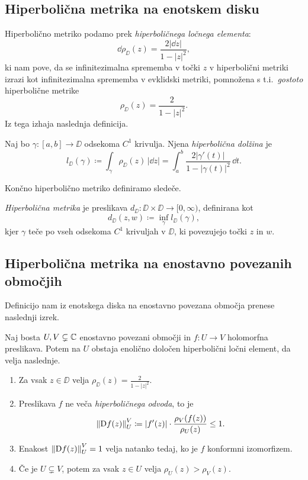 \subsection{Hiperbolična metrika na enotskem disku}

Hiperbolično metriko podamo prek \emph{hiperboličnega ločnega elementa}:
\[\dd \rho_{\DD} (z) = \frac{2 |\dd z|}{1 - |z|^2},\]
ki nam pove, da se infinitezimalna sprememba v točki \(z\) v hiperbolični metriki izrazi kot infinitezimalna sprememba v evklidski metriki, pomnožena s t.i.~\emph{gostoto} hiperbolične metrike
\[\rho_{\DD} (z) = \frac{2}{1 - |z|^2}.\]
Iz tega izhaja naslednja definicija.

\begin{definicija}
    Naj bo \(\gamma \colon [a, b] \to \DD\) odsekoma \(C^1\) krivulja. Njena \emph{hiperbolična dolžina} je
    \[l_{\DD} (\gamma) \coloneq \int_{\gamma} \rho_{\DD} (z) \, | \dd z | = \int_{a}^{b} \frac{2 | \gamma' (t) | }{1 - | \gamma (t) |^2} \, \dd t.\]
\end{definicija}

\noindent Končno hiperbolično metriko definiramo sledeče.

\begin{definicija}
    \emph{Hiperbolična metrika} je preslikava
    \(d_{\DD} \colon \DD \times \DD \to [0, \infty)\), definirana kot
    \[d_{\DD} (z, w) \coloneq \inf_{\gamma} l_{\DD} (\gamma),\]
    kjer \(\gamma\) teče po vseh odsekoma \(C^1\) krivuljah v \(\DD\), ki
    povezujejo točki \(z\) in \(w\).
\end{definicija}

\subsection{Hiperbolična metrika na enostavno povezanih območjih}

\noindent Definicijo nam iz enotskega diska na enostavno povezana območja prenese naslednji izrek.

\begin{izrek}[Pick] \label{thm:pick}
    Naj bosta \(U, V \subsetneq \mathbb C\) enostavno povezani območji in \(f \colon U \to V\) holomorfna preslikava. Potem na \(U\) obstaja enolično določen hiperbolični ločni element, da velja naslednje.
    \begin{enumerate}
        \item Za vsak \(z \in \DD\) velja \(\rho_{\DD} (z) = \frac{2}{1 - |z|^2}\).
        \item Preslikava \(f\) ne veča \emph{hiperboličnega odvoda}, to je \[\left\| \mathrm{D} f (z) \right\|_{U}^{V} \coloneq |f' (z)| \cdot \frac{\rho_V (f (z))}{\rho_U (z)} \leq 1.\]
        \item Enakost \(\left\| \mathrm{D} f (z) \right\|_{U}^{V} = 1\) velja natanko tedaj, ko je \(f\) konformni izomorfizem.
        \item Če je \(U \subsetneq V\), potem za vsak \(z \in U\) velja \(\rho_U (z) > \rho_V (z)\). 
    \end{enumerate}
\end{izrek}


